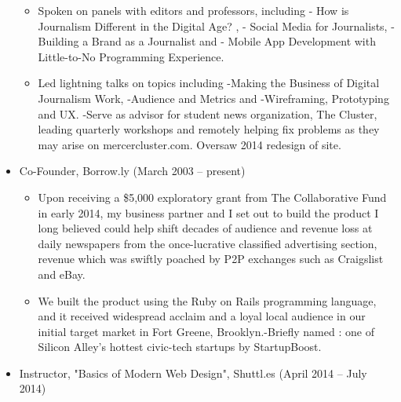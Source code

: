 \documentclass{article}
\begin{document}
\begin{itemize}[noitemsep,topsep=\mdcompacttopsep]
\begin{itemize}[noitemsep,topsep=\mdcompacttopsep]
\item{}Spoken on panels with editors and professors, including - How is Journalism Different in the Digital Age? , - Social Media for Journalists, - Building a Brand as a Journalist  and  - Mobile App Development with Little-to-No Programming Experience.%

\item{}Led lightning talks on topics including -Making the Business of Digital Journalism Work, -Audience and Metrics and -Wireframing, Prototyping and UX. -Serve as advisor for student news organization, The Cluster, leading quarterly workshops and remotely helping fix problems as they may arise on mercercluster.com. Oversaw 2014 redesign of site.%
\end{itemize}%

\item{}Co-Founder, Borrow.ly (March 2003 – present)

\begin{itemize}[noitemsep,topsep=\mdcompacttopsep]%

\item{}Upon receiving a \$5,000 exploratory grant from The Collaborative Fund in early 2014, my business partner and I set out to build the product I long believed could help shift decades of audience and revenue loss at daily newspapers from the once-lucrative classified advertising section, revenue which was swiftly poached by P2P exchanges such as Craigslist and eBay.%

\item{}
We built the product using the Ruby on Rails programming language, and it received widespread acclaim and a loyal local audience in our initial target market in Fort Greene, Brooklyn.-Briefly named : one of Silicon Alley's hottest civic-tech startups by StartupBoost.%
\end{itemize}%

\item{}Instructor, "Basics of Modern Web Design", Shuttl.es (April 2014 – July 2014)


\end{itemize}
\end{document}
